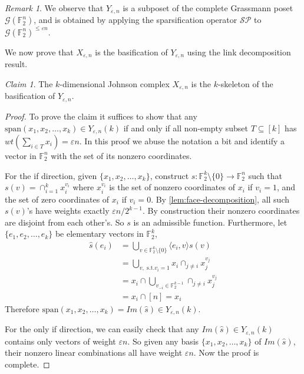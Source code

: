 \documentclass[10pt,a4paper]{article}
\newcommand{\prettyref}[1]{\cref{#1}}
\theoremstyle{definition}
\theoremstyle{remark}
\newtheorem{claim}[theorem]{Claim}
\newtheorem{remark}[theorem]{Remark}
\newcommand{\set}[1]{\{#1\}}
\newcommand{\iprod}[1]{\langle#1\rangle}
\def\sp{\mathrm{ span}}
\newcommand{\F}{\mathbb{F}}
\renewcommand{\le}{\leqslant}
\numberwithin{equation}{section}
\let\pref=\prettyref
\def\Gr{\mathcal{G}}
\def\M{\mathcal{SP}}
\begin{document}
\begin{remark}
    We observe that $Y_{\varepsilon,n}$ is a subposet of the complete Grassmann poset $\Gr(\F_2^n)$, and is obtained by applying the sparsification operator $\M$ to  $\Gr(\F_2^n)^{\le \varepsilon n}$.
\end{remark}

We now prove that $X_{\varepsilon,n}$ is the basification of $Y_{\varepsilon,n}$ using the link decomposition result.

\begin{claim}\label{claim:Johnson-basification}
    The $k$-dimensional Johnson complex $X_{\varepsilon,n}$ is the $k$-skeleton of the basification of $Y_{\varepsilon,n}$.
\end{claim} 

\begin{proof}
    To prove the claim it suffices to show that any $\sp(x_1, x_2, \dots, x_k)\in Y_{\varepsilon,n}(k)$ if and only if all non-empty subset $T \subseteq [k]$ has $wt(\sum_{i \in T}x_i) = \varepsilon n$. In this proof we abuse the notation a bit and identify a vector in $\F_2^n$ with the set of its nonzero coordinates.
    
    For the if direction, given $\set{x_1,x_2,\dots,x_k}$, construct $s:\F_2^{k}\setminus \set{0} \to \F_2^n$ such that $s(v) = \cap_{i=1}^{k} x_i^{v_i}$ where $x_i^{v_i}$ is the set of nonzero coordinates of $x_i$ if $v_i = 1$, and the set of zero coordinates of $x_i$ if $v_i = 0$. By \pref{lem:face-decomposition}, all such $s(v)$'s have weights exactly $\varepsilon n/2^{k-1}$. By construction their nonzero coordinates are disjoint from each other's. So $s$ is an admissible function. Furthermore, let $\{e_1, e_2,\dots,e_k\}$ be elementary vectors in $\F_2^k$,
    \begin{align*}
        \widehat{s}(e_i) &= \bigcup_{v \in \F_2^k\setminus \set{0}} \iprod{e_i, v} s(v) \\
        &= \bigcup_{v, \text{ s.t.} v_i=1} x_i \cap_{j\neq i} x_j^{v_j} \\
        &= x_i \cap \bigcup_{v_{-i}\in \F_2^{k-1}} \cap_{j\neq i}x_j^{v_j} \\
        &= x_i \cap [n] = x_i
    \end{align*}
    Therefore $\sp(x_1,x_2,\dots,x_k) = Im(\widehat{s}) \in Y_{\varepsilon,n}(k)$.

    For the only if direction, we can easily check that any $Im(\widehat{s})\in Y_{\varepsilon,n}(k)$ contains only vectors of weight $\varepsilon n$. So given any basis $\set{x_1,x_2,\dots,x_k}$ of $Im(\widehat{s})$, their nonzero linear combinations all have weight $\varepsilon n$. Now the proof is complete.
\end{proof}
\end{document}
